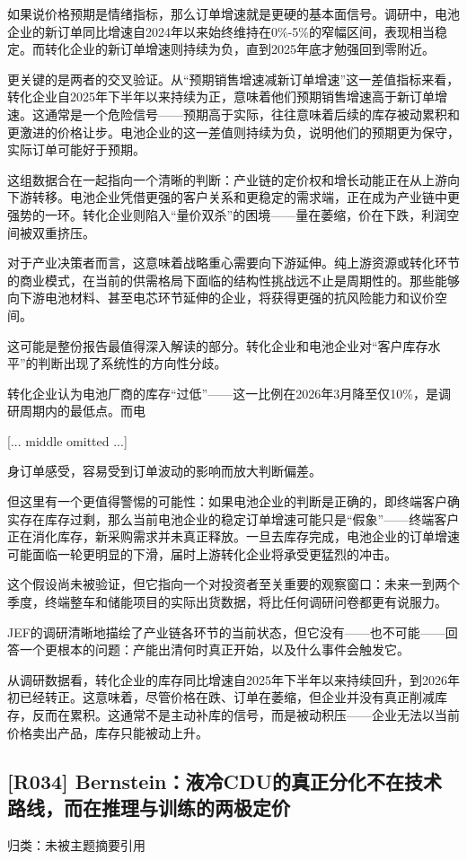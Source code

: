 \documentclass[11pt]{ctexart}
\begin{document}
如果说价格预期是情绪指标，那么订单增速就是更硬的基本面信号。调研中，电池企业的新订单同比增速自2024年以来始终维持在0\%-5\%的窄幅区间，表现相当稳定。而转化企业的新订单增速则持续为负，直到2025年底才勉强回到零附近。

更关键的是两者的交叉验证。从“预期销售增速减新订单增速”这一差值指标来看，转化企业自2025年下半年以来持续为正，意味着他们预期销售增速高于新订单增速。这通常是一个危险信号——预期高于实际，往往意味着后续的库存被动累积和更激进的价格让步。电池企业的这一差值则持续为负，说明他们的预期更为保守，实际订单可能好于预期。

这组数据合在一起指向一个清晰的判断：产业链的定价权和增长动能正在从上游向下游转移。电池企业凭借更强的客户关系和更稳定的需求端，正在成为产业链中更强势的一环。转化企业则陷入“量价双杀”的困境——量在萎缩，价在下跌，利润空间被双重挤压。

对于产业决策者而言，这意味着战略重心需要向下游延伸。纯上游资源或转化环节的商业模式，在当前的供需格局下面临的结构性挑战远不止是周期性的。那些能够向下游电池材料、甚至电芯环节延伸的企业，将获得更强的抗风险能力和议价空间。

这可能是整份报告最值得深入解读的部分。转化企业和电池企业对“客户库存水平”的判断出现了系统性的方向性分歧。

转化企业认为电池厂商的库存“过低”——这一比例在2026年3月降至仅10\%，是调研周期内的最低点。而电

[... middle omitted ...]

身订单感受，容易受到订单波动的影响而放大判断偏差。

但这里有一个更值得警惕的可能性：如果电池企业的判断是正确的，即终端客户确实存在库存过剩，那么当前电池企业的稳定订单增速可能只是“假象”——终端客户正在消化库存，新采购需求并未真正释放。一旦去库存完成，电池企业的订单增速可能面临一轮更明显的下滑，届时上游转化企业将承受更猛烈的冲击。

这个假设尚未被验证，但它指向一个对投资者至关重要的观察窗口：未来一到两个季度，终端整车和储能项目的实际出货数据，将比任何调研问卷都更有说服力。

JEF的调研清晰地描绘了产业链各环节的当前状态，但它没有——也不可能——回答一个更根本的问题：产能出清何时真正开始，以及什么事件会触发它。

从调研数据看，转化企业的库存同比增速自2025年下半年以来持续回升，到2026年初已经转正。这意味着，尽管价格在跌、订单在萎缩，但企业并没有真正削减库存，反而在累积。这通常不是主动补库的信号，而是被动积压——企业无法以当前价格卖出产品，库存只能被动上升。

\subsection{[R034] Bernstein：液冷CDU的真正分化不在技术路线，而在推理与训练的两极定价}
{\small\color{refgray}归类：未被主题摘要引用}
\end{document}
